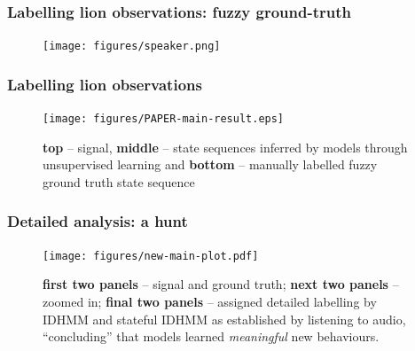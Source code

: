 \documentclass[aspectratio=169]{beamer}
\begin{document}
    \begin{frame}
        \frametitle{Labelling lion observations: fuzzy ground-truth}

        \begin{figure}
            \centering
            \texttt{[image: figures/speaker.png]}
        \end{figure}


    \end{frame}




    \begin{frame}
        \frametitle{Labelling lion observations}
        \begin{figure}[ht!]
            \texttt{[image: figures/PAPER-main-result.eps]}
            \vspace{-0.5em}
            \caption{{\bf top} --  signal, {\bf middle} -- state sequences inferred by models through unsupervised learning and {\bf bottom} -- manually labelled fuzzy ground truth state sequence}
        \end{figure}
    \end{frame}


    \begin{frame}
        \frametitle{Detailed analysis: a hunt}
        \begin{figure}
            \texttt{[image: figures/new-main-plot.pdf]}
            \caption{{\bf first two panels} -- signal and ground truth; {\bf next two panels} -- zoomed in; {\bf final two panels} --  assigned detailed labelling by IDHMM and stateful IDHMM as established by listening to audio, ``concluding'' that models learned \emph{meaningful} new behaviours.}
        \end{figure}
    \end{frame}





\end{document}
